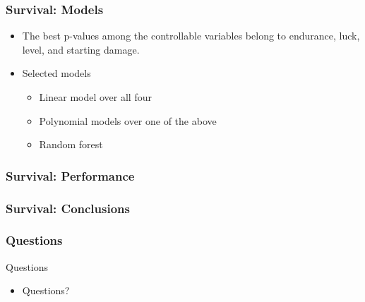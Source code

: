 \documentclass{beamer}
\begin{document}
\begin{frame}
  \frametitle{Survival: Models}
  \begin{itemize}
  \item The best p-values among the controllable variables belong to endurance, luck, level, and starting damage.
  \item Selected models
    \begin{itemize}
    \item Linear model over all four
    \item Polynomial models over one of the above
    \item Random forest
    \end{itemize}
  \end{itemize}
\end{frame}


\begin{frame}
  \frametitle{Survival: Performance}
  
\end{frame}


\begin{frame}
  \frametitle{Survival: Conclusions}
  
\end{frame}


\begin{frame}
  \frametitle{Questions}
  {\Huge Questions}
  \begin{itemize}
  \item Questions?
  \end{itemize}

\end{frame}
\end{document}
